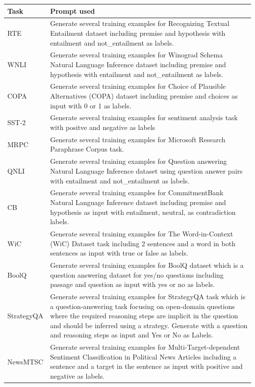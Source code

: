 \documentclass[letterpaper]{article} %
\begin{document}
\begin{table}[h!]
\begin{tabular}{l|p{5.5in}}
Task &
  Prompt used \\ \hline \hline
RTE & 
  Generate several training examples for Recognizing Textual Entailment dataset including premise and hypothesis with entailment and not\_entailment as labels. \\ \hline
WNLI & 
  Generate several training examples for Winograd Schema Natural Language Inference dataset including premise and hypothesis with entailment and not\_entailment as labels.   \\ \hline
COPA & 
  Generate several training examples for Choice of Plausible Alternatives (COPA) dataset including premise and choices as input with 0 or 1 as labels. \\ \hline
SST-2 &
  Generate several training examples for sentiment analysis task with positve and negative as labels \\ \hline
MRPC &
  Generate several training examples for Microsoft Research Paraphrase Corpus task. \\ \hline
QNLI &  
  Generate several training examples for Question answering  Natural Language Inference dataset using question answer pairs with entailment and not\_entailment as labels.   \\ \hline
CB &  
  Generate several training examples for CommitmentBank Natural Language Inference dataset including premise and hypothesis as input with entailment, neutral, as contradiction labels.  \\ \hline
WiC &  
  Generate several training examples for The Word-in-Context (WiC) Dataset task including 2 sentences and a word in both sentences as input with true or false as labels.   \\ \hline
BoolQ &  
  Generate several training examples for BoolQ dataset which is a question answering dataset for yes/no questions including passage and question as input with yes or no as labels.  \\ \hline \hline
StrategyQA &  
  Generate several training examples for StrategyQA task which is a question-answering task focusing on open-domain questions where the required reasoning steps are implicit in the question and should be inferred using a strategy.  Generate with a question and reasoning steps as input and Yes or No as Labels.  \\ \hline
NewsMTSC &  
  Generate several training examples for Multi-Target-dependent Sentiment Classification in Political News Articles including a sentence and a target in the sentence as input with positive and negative as labels.  \\ \hline

\end{tabular}
\end{table}
\end{document}
